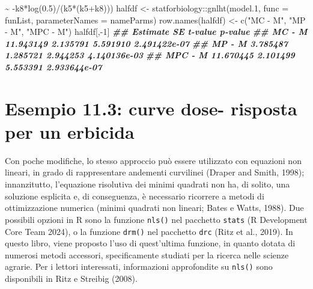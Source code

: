 \documentclass[
  12pt,
]{book}
\newenvironment{Shaded}{\begin{snugshade}}{\end{snugshade}}
\newcommand{\AttributeTok}[1]{\textcolor[rgb]{0.77,0.63,0.00}{#1}}
\newcommand{\DecValTok}[1]{\textcolor[rgb]{0.00,0.00,0.81}{#1}}
\newcommand{\DocumentationTok}[1]{\textcolor[rgb]{0.56,0.35,0.01}{\textbf{\textit{#1}}}}
\newcommand{\FloatTok}[1]{\textcolor[rgb]{0.00,0.00,0.81}{#1}}
\newcommand{\FunctionTok}[1]{\textcolor[rgb]{0.00,0.00,0.00}{#1}}
\newcommand{\NormalTok}[1]{#1}
\newcommand{\OtherTok}[1]{\textcolor[rgb]{0.56,0.35,0.01}{#1}}
\newcommand{\SpecialCharTok}[1]{\textcolor[rgb]{0.00,0.00,0.00}{#1}}
\newcommand{\StringTok}[1]{\textcolor[rgb]{0.31,0.60,0.02}{#1}}
\begin{document}
\begin{Shaded}
\begin{Highlighting}[]
                \SpecialCharTok{\textasciitilde{}} \SpecialCharTok{{-}}\NormalTok{k8}\SpecialCharTok{*}\FunctionTok{log}\NormalTok{(}\FloatTok{0.5}\NormalTok{)}\SpecialCharTok{/}\NormalTok{(k5}\SpecialCharTok{*}\NormalTok{(k5}\SpecialCharTok{+}\NormalTok{k8)))}
\NormalTok{halfdf }\OtherTok{\textless{}{-}}\NormalTok{ statforbiology}\SpecialCharTok{::}\FunctionTok{gnlht}\NormalTok{(model}\FloatTok{.1}\NormalTok{, }\AttributeTok{func =}\NormalTok{ funList,}
                                 \AttributeTok{parameterNames =}\NormalTok{ nameParms)}
\FunctionTok{row.names}\NormalTok{(halfdf) }\OtherTok{\textless{}{-}} \FunctionTok{c}\NormalTok{(}\StringTok{"MC {-} M"}\NormalTok{, }\StringTok{"MP {-} M"}\NormalTok{, }\StringTok{"MPC {-} M"}\NormalTok{)}
\NormalTok{halfdf[,}\SpecialCharTok{{-}}\DecValTok{1}\NormalTok{]}
\DocumentationTok{\#\#          Estimate       SE  t{-}value      p{-}value}
\DocumentationTok{\#\# MC {-} M  11.943149 2.135791 5.591910 2.491422e{-}07}
\DocumentationTok{\#\# MP {-} M   3.785487 1.285721 2.944253 4.140136e{-}03}
\DocumentationTok{\#\# MPC {-} M 11.670445 2.101499 5.553391 2.933644e{-}07}
\end{Highlighting}
\end{Shaded}

\normalsize

\hypertarget{esempio-11.3-curve-dose--risposta-per-un-erbicida}{%
\section{Esempio 11.3: curve dose- risposta per un erbicida}\label{esempio-11.3-curve-dose--risposta-per-un-erbicida}}

Con poche modifiche, lo stesso approccio può essere utilizzato con equazioni non lineari, in grado di rappresentare andementi curvilinei (Draper and Smith, 1998); innanzitutto, l'equazione risolutiva dei minimi quadrati non ha, di solito, una soluzione esplicita e, di conseguenza, è necessario ricorrere a metodi di ottimizzazione numerica (minimi quadrati non lineari; Bates e Watts, 1988). Due possibili opzioni in R sono la funzione \texttt{nls()} nel pacchetto \texttt{stats} (R Development Core Team 2024), o la funzione \texttt{drm()} nel pacchetto \texttt{drc} (Ritz et al., 2019). In questo libro, viene proposto l'uso di quest'ultima funzione, in quanto dotata di numerosi metodi accessori, specificamente studiati per la ricerca nelle scienze agrarie. Per i lettori interessati, informazioni approfondite su \texttt{nls()} sono disponibili in Ritz e Streibig (2008).
\end{document}
